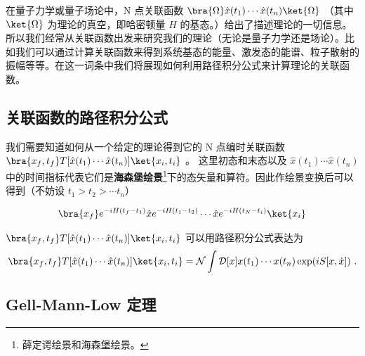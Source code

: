 
在量子力学或量子场论中，N 点关联函数 $\bra{\Omega}\hat x(t_1)\cdots \hat x(t_n)\ket{\Omega}$ （其中 $\ket{\Omega}$ 为理论的真空，即哈密顿量 $H$ 的基态。）给出了描述理论的一切信息。所以我们经常从关联函数出发来研究我们的理论（无论是量子力学还是场论）。比如我们可以通过计算关联函数来得到系统基态的能量、激发态的能谱、粒子散射的振幅等等。在这一词条中我们将展现如何利用路径积分公式来计算理论的关联函数。
\subsection{关联函数的路径积分公式}
我们需要知道如何从一个给定的理论得到它的 N 点编时关联函数
 $\bra{x_f,t_f} T[\hat x(t_1)\cdots \hat x(t_n)]\ket{x_i,t_i}$ 。
这里初态和末态以及 $\hat x(t_1)\cdots \hat x(t_n)$ 中的时间指标代表它们是\textbf{海森堡绘景}\footnote{薛定谔绘景和海森堡绘景。}下的态矢量和算符。因此作绘景变换后可以得到（不妨设 $t_1>t_2>\cdots t_n$）


\begin{equation}
\begin{aligned}
\bra{x_f} e^{-iH (t_f-t_1)} \hat x e^{-iH(t_1-t_2)}\cdots \hat x e^{-iH(t_N-t_i)}\ket{x_i}
\end{aligned}
\end{equation}

\begin{theorem}{}
$\bra{x_f,t_f} T[\hat x(t_1)\cdots \hat x(t_n)]\ket{x_i,t_i}$ 可以用路径积分公式表达为
\begin{equation}
\begin{aligned}
        \bra{x_f,t_f} T[\hat x(t_1)\cdots \hat x(t_n)]\ket{x_i,t_i}=
        \mathcal{N}\int \mathcal{D}[x] x(t_1)\cdots x(t_n) \exp(i S[x,\dot x])~.
\end{aligned}
\end{equation}
\end{theorem}
\subsection{Gell-Mann-Low 定理}
